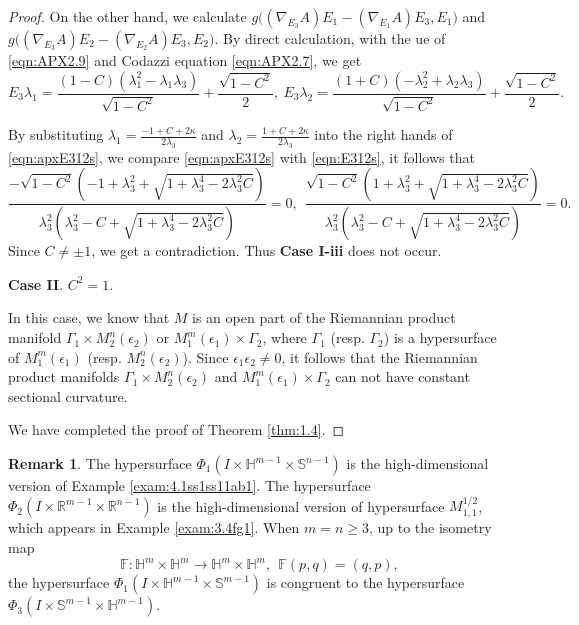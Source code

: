 \documentclass[reqno]{amsart}%
\theoremstyle{definition}
\newtheorem{remark}{Remark}[section]
\numberwithin{equation}{section}
\begin{document}
\begin{proof}
On the other hand, we calculate 
$g\big((\nabla_{E_3}A)E_{1}-(\nabla_{E_1}A)E_{3},E_1\big)$ and $g\big((\nabla_{E_3}A)E_{2}-(\nabla_{E_2}A)E_{3},E_2\big)$. 
By direct calculation, with the ue of \eqref{eqn:APX2.9} and Codazzi equation \eqref{eqn:APX2.7}, we get 
\begin{equation}\label{eqn:apxE312s}
E_3\lambda_1=\frac{(1-C)(\lambda_1^2-\lambda_1\lambda_3)}{\sqrt{1-C^2}}+\frac{\sqrt{1-C^2}}{2},\  
E_3\lambda_2=\frac{(1+C)(-\lambda_2^2+\lambda_2\lambda_3)}{\sqrt{1-C^2}}+\frac{\sqrt{1-C^2}}{2}.
\end{equation}

By substituting $\lambda_1=\frac{-1+C+2\kappa}{2\lambda_3}$ and $\lambda_2=\frac{1+C+2\kappa}{2\lambda_3}$ into the right hands of \eqref{eqn:apxE312s}, 
we compare \eqref{eqn:apxE312s} with \eqref{eqn:E312s}, it follows that  
$$
\frac{-\sqrt{1-C^2}(-1+\lambda_3^2+\sqrt{1+\lambda_3^4-2\lambda_3^2C})}
{\lambda_3^2(\lambda_3^2-C+\sqrt{1+\lambda_3^4-2\lambda_3^2C})}=0,\ \ 
\frac{\sqrt{1-C^2}(1+\lambda_3^2+\sqrt{1+\lambda_3^4-2\lambda_3^2C})}
{\lambda_3^2(\lambda_3^2-C+\sqrt{1+\lambda_3^4-2\lambda_3^2C})}=0. 
$$
Since $C\neq\pm1$, we get a contradiction. 
Thus {\bf Case I-iii} does not occur. 


\vskip 2mm

{\bf Case II}. $C^2=1$.

In this case, we know that $M$ is an open part of the Riemannian product manifold 
$\Gamma_1\times M_2^n(\epsilon_2)$  or $M_1^m(\epsilon_1)\times\Gamma_2$, where $\Gamma_1$ 
(resp. $\Gamma_2$) is a hypersurface of $M_1^m(\epsilon_1)$ (resp. $M_2^n(\epsilon_2)$). 
Since $\epsilon_1\epsilon_2\neq0$, it follows that the Riemannian product manifolds 
$\Gamma_1\times M_2^n(\epsilon_2)$ and $M_1^m(\epsilon_1)\times\Gamma_2$ 
can not have constant sectional curvature. 

We have completed the proof of Theorem \ref{thm:1.4}. 
\end{proof}


\begin{remark}
The hypersurface $\Phi_1(I\times \mathbb{H}^{m-1}\times \mathbb{S}^{n-1})$ is the high-dimensional version of  Example \ref{exam:4.1ss1ss11ab1}. 
The hypersurface $\Phi_2(I\times \mathbb{R}^{m-1}\times \mathbb{R}^{n-1})$ is the high-dimensional version of  hypersurface $M_{1,1}^{1/2}$, which appears in Example \ref{exam:3.4fg1}. 
When $m=n\geq3$, up to the isometry map
$$
\mathbb{F}:\mathbb{H}^m\times \mathbb{H}^m\rightarrow\mathbb{H}^m\times \mathbb{H}^m,\ \
\mathbb{F}(p,q)=(q,p),
$$
the hypersurface $\Phi_1(I\times \mathbb{H}^{m-1}\times \mathbb{S}^{m-1})$ is congruent to 
the hypersurface $\Phi_3(I\times \mathbb{S}^{m-1}\times \mathbb{H}^{m-1})$. 
\end{remark}
\end{document}
